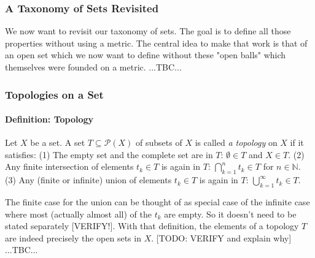 \subsubsection{A Taxonomy of Sets Revisited}
We now want to revisit our taxonomy of sets. The goal is to define all those properties without using a metric. The central idea to make that work is that of an open set which we now want to define without these "open balls" which themselves were founded on a metric. ...TBC...







\subsubsection{Topologies on a Set}


\paragraph{Definition: Topology} 
Let $X$ be a set. A set $T \subseteq \mathcal{P}(X)$ of subsets of $X$ is called \emph{a topology} on $X$ if it satisfies: (1) The empty set and the complete set are in $T$: $\emptyset \in T$ and $X \in T$. (2) Any finite intersection of elements $t_k \in T$ is again in $T$: $\bigcap_{k=1}^n t_k \in T$ for $n \in \mathbb{N}$. (3) Any (finite or infinite) union of elements $t_k \in T$ is again in $T$: $\bigcup_{k=1}^\infty t_k \in T$. 

\medskip
The finite case for the union can be thought of as special case of the infinite case where most (actually almost all) of the $t_k$ are empty. So it doesn't need to be stated separately [VERIFY!]. With that definition, the elements of a topology $T$ are indeed precisely the open sets in $X$. [TODO: VERIFY and explain why] ...TBC...

